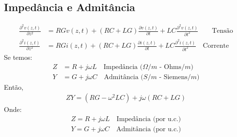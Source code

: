 \documentclass[11pt,a4paper]{article}
\begin{document}
\subsection{Impedância e Admitância}
\begin{align*}
  \frac{\partial^2 v(z,t) }{\partial z^2} &= RG v(z,t) + (RC+LG) \frac{\partial v(z,t)}{\partial t} + LC \frac{\partial^2 v(z,t)}{\partial t^2} \quad \quad \text{Tensão}\\
  \frac{\partial^2 i(z,t)}{\partial z^2} &= RGi(z,t) + (RC+LG) \frac{\partial i(z,t)}{\partial t}+ LC \frac{\partial^2 i(z,t)}{\partial t^2} \quad \text{Corrente}
\end{align*}
Se temos:
\begin{align*}
  Z &= R+ j\omega L \quad \text{Impedância ($\Omega /m$ - Ohms$/m$)} \\
  Y &= G+ j \omega C \quad \text{Admitância ($S/m$ - Siemens$/m$)} 
\end{align*}
Então,
\begin{align*}
  ZY = (RG - \omega^2 LC) + j \omega (RC+LG)
\end{align*}
Onde:
\begin{align*}
  Z= R+j\omega L \quad \text{Impedância (por u.c.)} \\
  Y= G+j\omega C \quad \text{Admitância (por u.c.)} 
\end{align*}
\end{document}
